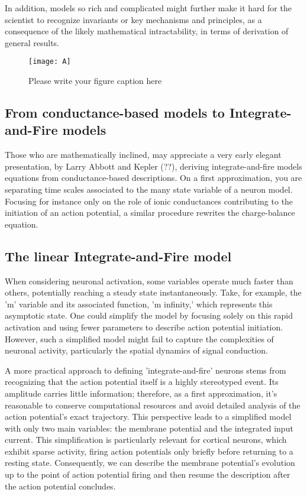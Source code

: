 In addition, models so rich and complicated might further make it hard for the scientist to recognize invariants or key mechanisms and principles, as a consequence of the likely mathematical intractability, in terms of derivation of general results.

\begin{figure}[t]
\sidecaption[t]
\centering
\texttt{[image: A]}
\caption{Please write your figure caption here}
\label{fig:A1}       %
\end{figure}



\subsection{From conductance-based models to Integrate-and-Fire models}

Those who are mathematically inclined, may appreciate a very early elegant presentation, by Larry Abbott and Kepler (??), deriving integrate-and-fire models equations from conductance-based descriptions. On a first approximation, you are separating time scales associated to the many state variable of a neuron model. Focusing for instance only on the role of ionic conductances contributing to the initiation of an action potential, a similar procedure rewrites the charge-balance equation.

\subsection{The linear Integrate-and-Fire model}

When considering neuronal activation, some variables operate much faster than others, potentially reaching a steady state instantaneously. Take, for example, the 'm' variable and its associated function, 'm infinity,' which represents this asymptotic state. One could simplify the model by focusing solely on this rapid activation and using fewer parameters to describe action potential initiation. However, such a simplified model might fail to capture the complexities of neuronal activity, particularly the spatial dynamics of signal conduction.

A more practical approach to defining 'integrate-and-fire' neurons stems from recognizing that the action potential itself is a highly stereotyped event. Its amplitude carries little information; therefore, as a first approximation, it's reasonable to conserve computational resources and avoid detailed analysis of the action potential's exact trajectory. This perspective leads to a simplified model with only two main variables: the membrane potential and the integrated input current. This simplification is particularly relevant for cortical neurons, which exhibit sparse activity, firing action potentials only briefly before returning to a resting state. Consequently, we can describe the membrane potential's evolution up to the point of action potential firing and then resume the description after the action potential concludes.

